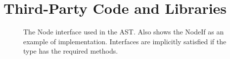 \chapter{Third-Party Code and Libraries}






\begin{figure}[h]
\caption[The Node Interface]{The Node interface used in the AST. Also shows the NodeIf as an example of implementation. Interfaces are implicitly satisfied if the type has the required methods. \label{lst:node-interface}}
\end{figure}
